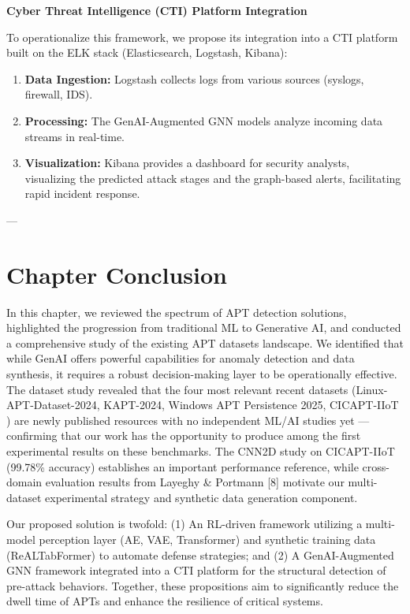\textbf{Cyber Threat Intelligence (CTI) Platform Integration}

To operationalize this framework, we propose its integration into a CTI platform built on the ELK stack (Elasticsearch, Logstash, Kibana):

\begin{enumerate}
\item \textbf{Data Ingestion:} Logstash collects logs from various sources (syslogs, firewall, IDS).
\item \textbf{Processing:} The GenAI-Augmented GNN models analyze incoming data streams in real-time.
\item \textbf{Visualization:} Kibana provides a dashboard for security analysts, visualizing the predicted attack stages and the graph-based alerts, facilitating rapid incident response.
\end{enumerate}

---

\section{Chapter Conclusion}

In this chapter, we reviewed the spectrum of APT detection solutions, highlighted the progression from traditional ML to Generative AI, and conducted a comprehensive study of the existing APT datasets landscape. We identified that while GenAI offers powerful capabilities for anomaly detection and data synthesis, it requires a robust decision-making layer to be operationally effective. The dataset study revealed that the four most relevant recent datasets (Linux-APT-Dataset-2024, KAPT-2024, Windows APT Persistence 2025, CICAPT-IIoT \cite{ghiasvand2024cicapt}) are newly published resources with no independent ML/AI studies yet — confirming that our work has the opportunity to produce among the first experimental results on these benchmarks. The CNN2D study on CICAPT-IIoT \cite{ghiasvand2024cicapt} (99.78\% accuracy) establishes an important performance reference, while cross-domain evaluation results from Layeghy \& Portmann [8] motivate our multi-dataset experimental strategy and synthetic data generation component.

Our proposed solution is twofold: (1) An RL-driven framework utilizing a multi-model perception layer (AE, VAE, Transformer) and synthetic training data (ReALTabFormer) to automate defense strategies; and (2) A GenAI-Augmented GNN framework integrated into a CTI platform for the structural detection of pre-attack behaviors. Together, these propositions aim to significantly reduce the dwell time of APTs and enhance the resilience of critical systems.

